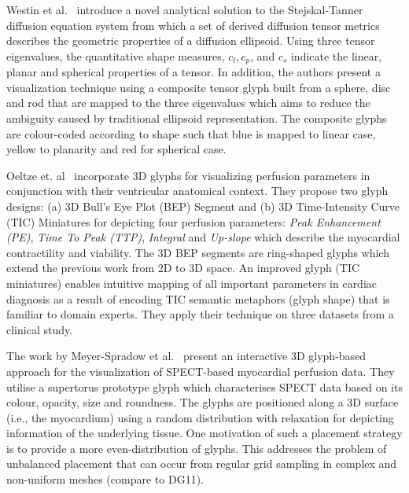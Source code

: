 
Westin et al.~\cite{westin02processing} introduce a novel analytical solution to the Stejskal-Tanner diffusion equation system from which a set of derived diffusion tensor metrics describes the geometric properties of a diffusion ellipsoid. Using three tensor eigenvalues, the quantitative shape measures, $c_l, c_p$, and $c_s$ indicate the linear, planar and spherical properties of a tensor.
In addition, the authors present a visualization technique using a composite tensor glyph built from a sphere, disc and rod that are mapped to the three eigenvalues which aims to reduce the ambiguity caused by traditional ellipsoid representation. The composite glyphs are colour-coded according to shape such that blue is mapped to linear case, yellow to planarity and red for spherical case.

Oeltze et. al~\cite{oeltze08myocardial} incorporate 3D glyphs for visualizing  perfusion parameters in conjunction with their ventricular anatomical context. They propose two glyph designs: (a) 3D Bull's Eye Plot (BEP) Segment and (b) 3D Time-Intensity Curve (TIC) Miniatures for depicting four perfusion parameters: \emph{Peak Enhancement (PE)}, \emph{Time To Peak (TTP)}, \emph{Integral} and \emph{Up-slope} which describe the myocardial contractility and viability.
The 3D BEP segments are ring-shaped glyphs which extend the previous work \cite{cerqueira02} from 2D to 3D space.
An improved glyph (TIC miniatures) enables intuitive mapping of all important parameters in cardiac diagnosis as a result of encoding TIC semantic metaphors (glyph shape) that is familiar to domain experts.
They apply their technique on three datasets from a clinical study.

The work by Meyer-Spradow et al.~\cite{meyer-spradow08specGlyphs} present an interactive 3D glyph-based approach for the visualization of SPECT-based myocardial perfusion data. They utilise a supertorus prototype glyph which characterises SPECT data based on its colour, opacity, size and roundness. 
The glyphs are positioned along a 3D surface (i.e., the myocardium) using a random distribution with relaxation for depicting information of the underlying tissue. 
One motivation of such a placement strategy is to provide a more even-distribution of glyphs. 
This addresses the problem of unbalanced placement that can occur from regular grid sampling in complex and non-uniform meshes (compare to DG11).

